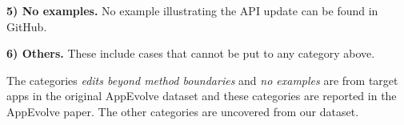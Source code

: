 \vspace{0.25\baselineskip}\noindent\textbf{5) No examples.} No example
illustrating the API update can be found in GitHub.

\vspace{0.25\baselineskip}\noindent\textbf{6) Others.} These include cases that cannot be put to any category above.

\vspace{0.25\baselineskip}\noindent The categories {\em edits
beyond method boundaries} and {\em no examples} are from target apps in the
original AppEvolve dataset and these categories are reported in the
AppEvolve paper. The other categories are uncovered from our dataset.


\lstset{
	language=text,numbers=none, breaklines=true, aboveskip=-7pt,
	belowskip= -6pt }

